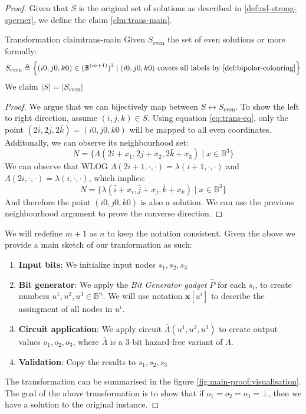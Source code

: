 \begin{proof}
Given that $S$ is the original set of solutions as described in \ref{def:nd-strong-sperner}, we define the claim \ref{clm:trans-main}.

\begin{claimbox}{Transformation claim}{trans-main}
    \label{clm:main-proof:trans-claim}
    Given $S_{\text{even}}$ the set of even solutions or more formally:
    $$
        S_{\text{even}} \triangleq
        \Big\{(i0,j0,k0) \in (\mathbb{B}^{(m+1)})^3 \mid (i0,j0,k0) \text{ covers all labels by \ref{def:bipolar-colouring}} \Big\}
    $$
    We claim $|S| = |S_{\text{even}}|$
\end{claimbox}

\begin{proof}
    We argue that we can bijectively map between $S \leftrightarrow S_{\text{even}}$.
    To show the left to right direction, assume $(i,j,k) \in S$.
    Using equation \ref{eq:trans-eq}, only the point $(2\bar{i}, 2\bar{j}, 2\bar{k}) = (i0, j0,k0)$ will be mapped to all even coordinates.
    Additonally, we can observe its neighbourhood set:
    $$
    N = \Big\{\Lambda(2\bar{i} + x_1, 2\bar{j} + x_2, 2\bar{k} + x_3) \mid x \in \mathbb{B}^3 \Big\}
    $$
    We can observe that WLOG $\Lambda(2i + 1, \cdot, \cdot) = \lambda(i + 1, \cdot, \cdot)$ and
    $\Lambda(2i, \cdot, \cdot) = \lambda(i, \cdot, \cdot)$, which implies:
    $$
    N = \Big\{\lambda(\bar{i} + x_i, \bar{j} + x_j, \bar{k} + x_k) \mid x \in \mathbb{B}^3 \Big\}
    $$
    And therefore the point $(i0, j0,k0)$ is also a solution. We can use the previous neighbourhood argument to prove the converse direction.
\end{proof}
We will redefine $m + 1$ as $n$ to keep the notation consistent.
Given the above we provide a main sketch of our tranformation as such:
\begin{enumerate}
    \item \textbf{Input bits}: We initialize input nodes $s_1, s_2, s_3$
    \item \textbf{Bit generator}: We apply the \textit{Bit Generator gadget} $\hat{P}$ for each $s_i$,
        to create numbers $u^1, u^2, u^3 \in \mathbb{B}^{n}$.  We will use notation $\mathbf{x}[u^i]$ to
        describe the assingment of all nodes in $u^i$.
    \item \textbf{Circuit application}: We apply circuit $\bar{\Lambda}(u^1, u^2, u^3)$ to create output values $o_1, o_2, o_3$, where 
$\bar{\Lambda}$ is a 3-bit hazard-free variant of $\Lambda$.
    \item \textbf{Validation}: Copy the results to $s_1, s_2, s_3$
\end{enumerate}
The transformation can be summarised in the figure \ref{fig:main-proof:visualisation}.
The goal of the above transformation is to show that if $o_1 = o_2 =o_3 = \bot$, then we have a solution
to the original instance.


\end{proof}
